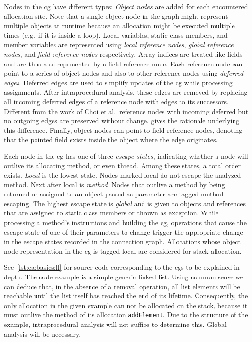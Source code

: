 			Nodes in the \gls{cg} have different types: \emph{Object nodes} are added for each encountered allocation site.
			Note that a single object node in the graph might represent multiple objects at runtime because an allocation
			might be executed multiple times (e.g.\ if it is inside a loop). Local variables, static class members, and member
			variables are represented using \emph{local reference nodes}, \emph{global reference nodes}, and \emph{field
			reference nodes} respectively. Array indices are treated like fields and are thus also represented by a field
			reference node. Each reference node can point to a series of object nodes and also to other reference nodes using
			\emph{deferred edges}. Deferred edges are used to simplify updates of the \gls{cg} while processing assignments.
			After intraprocedural analysis, these edges are removed by replacing all incoming deferred edges of a reference
			node with edges to its successors. Different from the work of Choi et al.\ reference nodes with incoming deferred
			but no outgoing edges are preserved without change.  gives the rationale
			underlying this difference. Finally, object nodes can point to field reference nodes, denoting that the pointed
			field exists inside the object where the edge originates.

			Each node in the \gls{cg} has one of three \emph{escape states}, indicating whether a node will outlive its
			allocating method, or even thread. Among these states, a total order exists. \emph{Local} is the lowest state.
			Nodes marked local do not escape the analyzed method. Next after local is \emph{method}. Nodes that outlive
			a method by being returned or assigned to an object passed as parameter are tagged method-escaping. The highest
			escape state is \emph{global} and is given to objects and references that are assigned to static class members or
			thrown as exception. While processing a method's instructions and building the \gls{cg}, operations that cause the
			escape state of one of their parameters to change trigger the appropriate change in the escape states recorded in
			the connection graph. Allocations whose object node representation in the \gls{cg} is tagged local are considered
			for stack allocation.

			See~\cref{lst:ea:basics:ll} for source code corresponding to the \glspl{cg} to be explained in depth. The
			code example is a simple generic linked list. Using common sense we can deduce that, in the absence of a removal
			operation, all list elements will be reachable until the list itself has reached the end of its lifetime.
			Consequently, the only allocation in the given example can not be allocated on the stack, because it must outlive
			the method of its allocation \texttt{addElement}. Due to the structure of the example, intraprocedural analysis
			will not suffice to determine this. Global analysis will be necessary.

